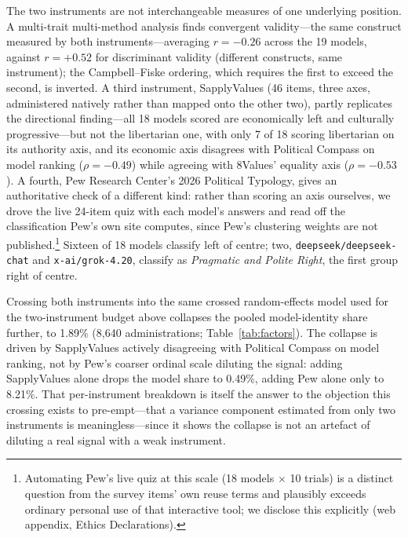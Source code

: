 \documentclass[11pt]{article}
\begin{document}
The two instruments are not interchangeable measures of one underlying
position. A multi-trait multi-method analysis finds convergent
validity---the same construct measured by both instruments---averaging
$r=-0.26$ across the 19 models, against $r=+0.52$ for discriminant validity
(different constructs, same instrument); the Campbell--Fiske ordering, which
requires the first to exceed the second, is inverted. A third instrument,
SapplyValues (46 items, three axes, administered natively rather than
mapped onto the other two), partly replicates the directional finding---all
18 models scored are economically left and culturally progressive---but not
the libertarian one, with only 7 of 18 scoring libertarian on its authority
axis, and its economic axis disagrees with Political Compass on model
ranking ($\rho=-0.49$) while agreeing with 8Values' equality axis
($\rho=-0.53$). A fourth, Pew Research Center's 2026 Political Typology,
gives an authoritative check of a different kind: rather than scoring an
axis ourselves, we drove the live 24-item quiz with each model's answers and
read off the classification Pew's own site computes, since Pew's clustering
weights are not published.\footnote{Automating Pew's live quiz at this
scale (18 models $\times$ 10 trials) is a distinct question from the survey
items' own reuse terms and plausibly exceeds ordinary personal use of that
interactive tool; we disclose this explicitly (web appendix, Ethics
Declarations).} Sixteen of 18 models classify left of centre; two,
\texttt{deepseek/deepseek-chat} and \texttt{x-ai/grok-4.20}, classify as
\emph{Pragmatic and Polite Right}, the first group right of centre.

Crossing both instruments into the same crossed random-effects model used
for the two-instrument budget above collapses the pooled model-identity
share further, to 1.89\% (8{,}640 administrations; Table~\ref{tab:factors}).
The collapse is driven by SapplyValues actively disagreeing with Political
Compass on model ranking, not by Pew's coarser ordinal scale diluting the
signal: adding SapplyValues alone drops the model share to 0.49\%, adding
Pew alone only to 8.21\%. That per-instrument breakdown is itself the answer
to the objection this crossing exists to pre-empt---that a variance
component estimated from only two instruments is meaningless---since it
shows the collapse is not an artefact of diluting a real signal with a weak
instrument.
\end{document}
